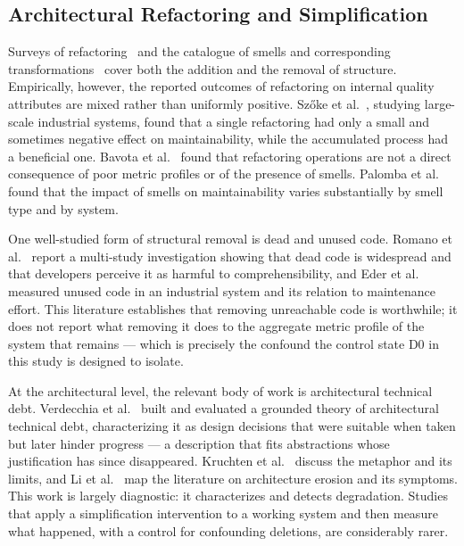 \documentclass{sbc2019}%
\begin{document}
\subsection{Architectural Refactoring and Simplification}

Surveys of refactoring~\cite{mens2004} and the catalogue of smells and
corresponding transformations~\cite{fowler2018} cover both the addition and the
removal of structure. Empirically, however, the reported outcomes of refactoring
on internal quality attributes are mixed rather than uniformly positive.
Sz\H{o}ke et al.\ \cite{szoke2017}, studying large-scale industrial systems,
found that a single refactoring had only a small and sometimes negative effect
on maintainability, while the accumulated process had a beneficial one. Bavota
et al.\ \cite{bavota2015} found that refactoring operations are not a direct
consequence of poor metric profiles or of the presence of smells. Palomba et
al.\ \cite{palomba2018} found that the impact of smells on maintainability
varies substantially by smell type and by system.

One well-studied form of structural removal is dead and unused code. Romano et al.\ \cite{romano2020} report a multi-study
investigation showing that dead code is widespread and that developers perceive
it as harmful to comprehensibility, and Eder et al.\ \cite{eder2012} measured
unused code in an industrial system and its relation to maintenance effort.
This literature establishes that removing unreachable code is worthwhile; it
does not report what removing it does to the aggregate metric profile of the
system that remains --- which is precisely the confound the control state D0 in
this study is designed to isolate.

At the architectural level, the relevant body of work is architectural
technical debt. Verdecchia et al.\ \cite{verdecchia2020,verdecchia2021} built
and evaluated a grounded theory of architectural technical debt, characterizing
it as design decisions that were suitable when taken but later hinder progress
--- a description that fits abstractions whose justification has since
disappeared. Kruchten et al.\ \cite{kruchten2012} discuss the metaphor and its
limits, and Li et al.\ \cite{li2022} map the literature on architecture erosion
and its symptoms. This work is largely diagnostic: it characterizes and detects
degradation. Studies that apply a simplification intervention to a working
system and then measure what happened, with a control for confounding
deletions, are considerably rarer.
\end{document}
